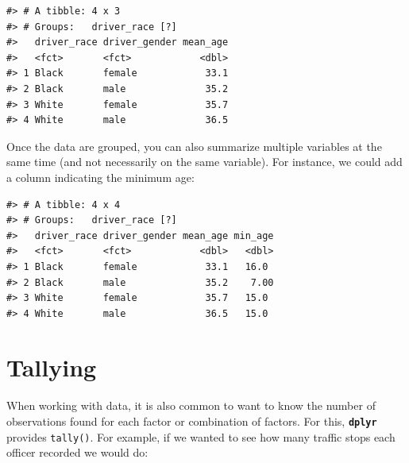 \documentclass[]{book}
\newenvironment{Shaded}{\begin{snugshade}}{\end{snugshade}}
\newcommand{\KeywordTok}[1]{\textcolor[rgb]{0.13,0.29,0.53}{\textbf{#1}}}
\newcommand{\DataTypeTok}[1]{\textcolor[rgb]{0.13,0.29,0.53}{#1}}
\newcommand{\StringTok}[1]{\textcolor[rgb]{0.31,0.60,0.02}{#1}}
\newcommand{\OtherTok}[1]{\textcolor[rgb]{0.56,0.35,0.01}{#1}}
\newcommand{\OperatorTok}[1]{\textcolor[rgb]{0.81,0.36,0.00}{\textbf{#1}}}
\newcommand{\NormalTok}[1]{#1}
\theoremstyle{definition}
\theoremstyle{definition}
\theoremstyle{definition}
\theoremstyle{remark}
\begin{document}
\begin{verbatim}
#> # A tibble: 4 x 3
#> # Groups:   driver_race [?]
#>   driver_race driver_gender mean_age
#>   <fct>       <fct>            <dbl>
#> 1 Black       female            33.1
#> 2 Black       male              35.2
#> 3 White       female            35.7
#> 4 White       male              36.5
\end{verbatim}

Once the data are grouped, you can also summarize multiple variables at
the same time (and not necessarily on the same variable). For instance,
we could add a column indicating the minimum age:

\begin{Shaded}
\end{Shaded}

\begin{verbatim}
#> # A tibble: 4 x 4
#> # Groups:   driver_race [?]
#>   driver_race driver_gender mean_age min_age
#>   <fct>       <fct>            <dbl>   <dbl>
#> 1 Black       female            33.1   16.0 
#> 2 Black       male              35.2    7.00
#> 3 White       female            35.7   15.0 
#> 4 White       male              36.5   15.0
\end{verbatim}

\section{Tallying}\label{tallying}

When working with data, it is also common to want to know the number of
observations found for each factor or combination of factors. For this,
\textbf{\texttt{dplyr}} provides \texttt{tally()}. For example, if we
wanted to see how many traffic stops each officer recorded we would do:

\begin{Shaded}
\end{Shaded}
\end{document}
